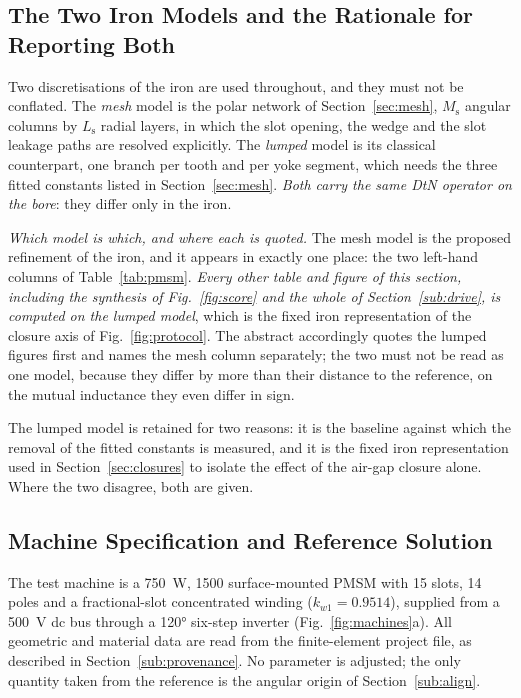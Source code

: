 \documentclass[10pt,a4paper,twocolumn]{article}
\theoremstyle{plain}
\theoremstyle{remark}
\begin{document}
\subsection{The Two Iron Models and the Rationale for Reporting Both}
\label{sub:twomodels}

Two discretisations of the iron are used throughout, and they must not
be conflated. The \emph{mesh} model is the polar network of
Section~\ref{sec:mesh}, $M_{\mathrm{s}}$ angular columns by
$L_{\mathrm{s}}$ radial layers, in which the slot opening, the wedge and
the slot leakage paths are resolved explicitly. The \emph{lumped} model
is its classical counterpart, one branch per tooth and per yoke segment,
which needs the three fitted constants listed in
Section~\ref{sec:mesh}. \emph{Both carry the same DtN operator on the
bore}: they differ only in the iron.

\emph{Which model is which, and where each is quoted.} The mesh model is
the proposed refinement of the iron, and it appears in exactly one place:
the two left-hand columns of Table~\ref{tab:pmsm}. \emph{Every other
table and figure of this section, including the synthesis of
Fig.~\ref{fig:score} and the whole of Section~\ref{sub:drive}, is
computed on the lumped model}, which is the fixed iron representation of
the closure axis of Fig.~\ref{fig:protocol}. The abstract accordingly
quotes the lumped figures first and names the mesh column separately;
the two must not be read as one model, because they differ by more than
their distance to the reference, on the mutual inductance they even
differ in sign.

The lumped model is retained for two reasons: it is
the baseline against which the removal of the fitted constants is
measured, and it is the fixed iron representation used in
Section~\ref{sec:closures} to isolate the effect of the air-gap
closure alone. Where the two disagree, both are given.

\subsection{Machine Specification and Reference Solution}
\label{sub:machine}

The test machine is a \SI{750}{\watt}, \SI{1500}{\rpm} surface-mounted
PMSM with 15 slots, 14 poles and a fractional-slot concentrated winding
($k_{w1}=0.9514$), supplied from a \SI{500}{\volt} dc bus through a
\ang{120} six-step inverter (Fig.~\ref{fig:machines}a). All geometric
and material data are read from the finite-element project file, as
described in Section~\ref{sub:provenance}. No parameter is adjusted; the
only quantity taken from the reference is the angular origin of
Section~\ref{sub:align}.
\end{document}
